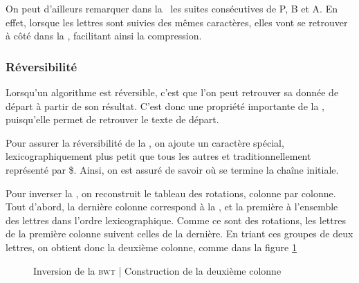 On peut d'ailleurs remarquer dans la \bwt\ les suites consécutives de P, B et A. En effet, lorsque les lettres sont suivies des mêmes caractères, elles vont se retrouver à côté dans la \bwt, facilitant ainsi la compression.

\subsubsection{Réversibilité}
Lorsqu'un algorithme est réversible, c'est que l'on peut retrouver sa donnée de départ à partir de son résultat. C'est donc une propriété importante de la \bwt, puisqu'elle permet de retrouver le texte de départ.

Pour assurer la réversibilité de la \bwt, on ajoute un caractère spécial, lexicographiquement plus petit que tous les autres et traditionnellement représenté par \$. Ainsi, on est assuré de savoir où se termine la chaîne initiale.

Pour inverser la \bwt, on reconstruit le tableau des rotations, colonne par colonne.
Tout d'abord, la dernière colonne correspond à la \bwt, et la première à l'ensemble des lettres dans l'ordre lexicographique. Comme ce sont des rotations, les lettres de la première colonne suivent celles de la dernière. En triant ces groupes de deux lettres, on obtient donc la deuxième colonne, comme dans la figure \ref{unbwt}

\begin{figure}[h!]
\caption{Inversion de la \textsc{bwt} | Construction de la deuxième colonne}
\label{unbwt} 
\end{figure}

